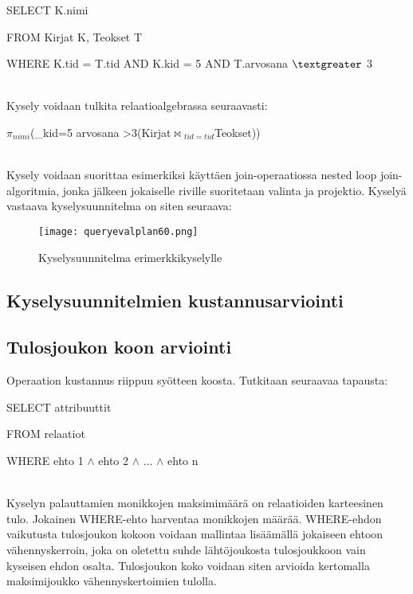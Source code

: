 \documentclass[finnish]{tktltiki2}
\theoremstyle{definition}
\theoremstyle{remark}
\begin{document}
\begin{frame}

SELECT K.nimi

FROM Kirjat K, Teokset T

WHERE K.tid = T.tid AND K.kid = 5 AND T.arvosana $\textgreater$  3
\end{frame}
\\\newline
Kysely voidaan tulkita relaatioalgebrassa seuraavasti:

\begin{frame}

$\pi$$_{nimi}$(\sigma_{kid=5 \wedge arvosana \textgreater 3}(Kirjat$\Join$$ _{tid=tid}$Teokset))
\end{frame}
\\\newline
Kysely voidaan suorittaa esimerkiksi käyttäen join-operaatiossa nested loop join-algoritmia, jonka jälkeen jokaiselle riville suoritetaan 
valinta ja projektio. Kyselyä vastaava kyselysuunnitelma on siten seuraava:

\begin{figure}[!h]
  \caption{Kyselysuunnitelma erimerkkikyselylle}
  \centering
    \texttt{[image: queryevalplan60.png]}
\end{figure}

\subsection{Kyselysuunnitelmien kustannusarviointi}

\subsection{Tulosjoukon koon arviointi}
Operaation kustannus riippuu syötteen koosta. Tutkitaan seuraavaa tapausta:
\newline

\begin{frame}

SELECT attribuuttit

FROM relaatiot

WHERE ehto 1 $\wedge$ ehto 2 $\wedge$ ... $\wedge$ ehto n
\end{frame}
\\\newline
Kyselyn palauttamien monikkojen maksimimäärä on relaatioiden karteesinen tulo. Jokainen WHERE-ehto harventaa monikkojen määrää. WHERE-ehdon vaikutusta tulosjoukon kokoon voidaan mallintaa lisäämällä jokaiseen ehtoon vähennyskerroin, joka on oletettu suhde lähtöjoukosta tulosjoukkoon vain kyseisen ehdon osalta.
Tulosjoukon koko voidaan siten arvioida kertomalla maksimijoukko vähennyskertoimien tulolla. \cite{ramakrishnan2003database}
\end{document}
